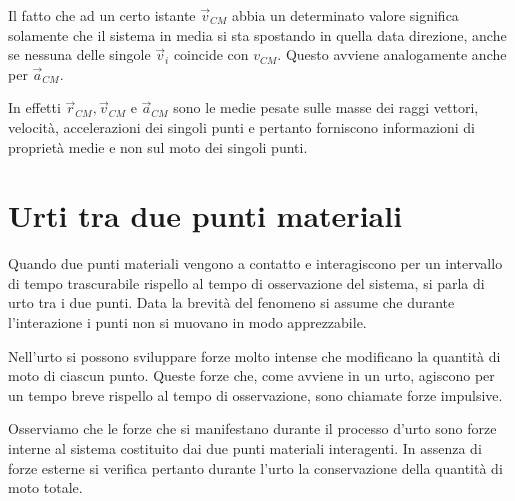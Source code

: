 \documentclass[class=book, crop=false, oneside, 12pt]{standalone}
\begin{document}
Il fatto che ad un certo istante \(\overrightarrow{v}_{CM}\) abbia un determinato valore significa solamente che il sistema in media si sta spostando in quella data direzione, anche se nessuna delle singole \(\overrightarrow{v}_i\) coincide con \(v_{CM}\).
Questo avviene analogamente anche per \(\overrightarrow{a}_{CM}\).

In effetti \(\overrightarrow{r}_{CM}, \overrightarrow{v}_{CM}\) e \(\overrightarrow{a}_{CM}\) sono le medie pesate sulle masse dei raggi vettori, velocità, accelerazioni dei singoli punti e pertanto forniscono informazioni di proprietà medie e non sul moto dei singoli punti. 

\section{Urti tra due punti materiali}

Quando due punti materiali vengono a contatto e interagiscono per un intervallo di tempo trascurabile rispello al tempo di osservazione del sistema, si parla di urto tra i due punti.
Data la brevità del fenomeno si assume che durante l'interazione i punti non si muovano in modo apprezzabile.

Nell'urto si possono sviluppare forze molto intense che modificano la quantità di moto di ciascun punto.
Queste forze che, come avviene in un urto, agiscono per un tempo breve rispello al tempo di osservazione, sono chiamate forze impulsive.

Osserviamo che le forze che si manifestano durante il processo d'urto sono forze interne al sistema costituito dai due punti materiali interagenti. 
In assenza di forze esterne si verifica pertanto durante l'urto la conservazione della quantità di moto totale.
\end{document}
